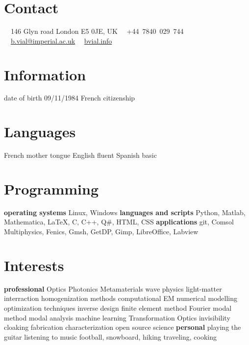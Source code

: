 \documentclass{cv}
\begin{document}



\begin{aside} %
	\section{Contact}
	\faHome~~146 Glyn road
	London E5 0JE, UK
	\faPhone~~+44~7840~029~744
	\faEnvelope~~\href{mailto:b.vial@imperial.ac.uk}{b.vial@imperial.ac.uk}
	\faUser~~\href{http://bvial.info/}{bvial.info}
	\section{Information}
	date of birth 09/11/1984
	French citizenship
	\section{Languages}
	French mother tongue
	English fluent
	Spanish basic
	\section{Programming}
	\textbf{operating systems}
	Linux, Windows
	\textbf{languages and scripts}
	Python, Matlab, Mathematica, \LaTeX, C, C++, Q\#, HTML, CSS
	\textbf{applications}
	git, Comsol Multiphysics, Fenics, Gmsh, GetDP, Gimp, LibreOffice, Labview
	\section{Interests}
	\textbf{professional}
	Optics
	Photonics
	Metamaterials
	wave physics
	light-matter interraction
	homogenization methods
	computational EM
	numerical modelling
	optimization techniques
	inverse design
	finite element method
	Fourier modal method
	modal analysis
	machine learning
	Transformation Optics
	invisibility cloaking
	fabrication
	characterization
	open source science
	\textbf{personal}
	playing the guitar
	listening to music
	football, snowboard, hiking
	traveling, cooking
\end{aside}


\end{document}
